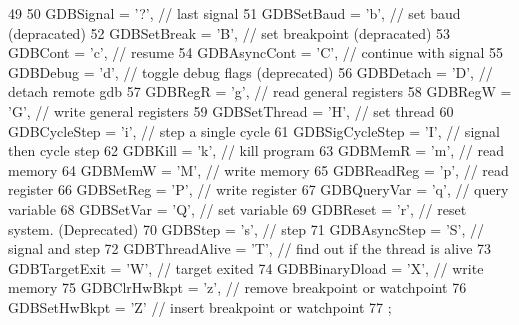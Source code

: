 \begin{DoxyCode}
49 {
50     GDBSignal              = '?', // last signal
51     GDBSetBaud             = 'b', // set baud (depracated)
52     GDBSetBreak            = 'B', // set breakpoint (depracated)
53     GDBCont                = 'c', // resume
54     GDBAsyncCont           = 'C', // continue with signal
55     GDBDebug               = 'd', // toggle debug flags (deprecated)
56     GDBDetach              = 'D', // detach remote gdb
57     GDBRegR                = 'g', // read general registers
58     GDBRegW                = 'G', // write general registers
59     GDBSetThread           = 'H', // set thread
60     GDBCycleStep           = 'i', // step a single cycle
61     GDBSigCycleStep        = 'I', // signal then cycle step
62     GDBKill                = 'k', // kill program
63     GDBMemR                = 'm', // read memory
64     GDBMemW                = 'M', // write memory
65     GDBReadReg             = 'p', // read register
66     GDBSetReg              = 'P', // write register
67     GDBQueryVar            = 'q', // query variable
68     GDBSetVar              = 'Q', // set variable
69     GDBReset               = 'r', // reset system.  (Deprecated)
70     GDBStep                = 's', // step
71     GDBAsyncStep           = 'S', // signal and step
72     GDBThreadAlive         = 'T', // find out if the thread is alive
73     GDBTargetExit          = 'W', // target exited
74     GDBBinaryDload         = 'X', // write memory
75     GDBClrHwBkpt           = 'z', // remove breakpoint or watchpoint
76     GDBSetHwBkpt           = 'Z'  // insert breakpoint or watchpoint
77 };
\end{DoxyCode}


